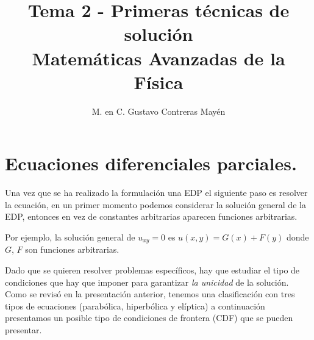 
\usepackage{apacite}
\title{Tema 2 - Primeras técnicas de solución \\[0.3em]  \large{Matemáticas Avanzadas de la Física}\vspace{-3ex}}
\author{M. en C. Gustavo Contreras Mayén}
\date{ }

\vspace{-4cm}
\maketitle
\fontsize{14}{14}\selectfont
\tableofcontents
\newpage
\section{Ecuaciones diferenciales parciales.}
Una vez que se ha realizado la formulación una EDP el siguiente paso es resolver la ecuación, en un primer momento podemos considerar la solución general de la EDP, entonces en vez de constantes arbitrarias aparecen funciones arbitrarias.
\par
Por ejemplo, la solución general de $u_{xy} = 0$ es $u(x, y) = G(x) + F (y)$ donde $G$, $F$ son funciones arbitrarias.
\par
Dado que se quieren resolver problemas específicos, hay que estudiar el tipo de condiciones que hay que imponer para garantizar \emph{la unicidad} de la solución. Como se revisó en la presentación anterior, tenemos una clasificación con tres tipos de ecuaciones (parabólica, hiperbólica y elíptica) a continuación presentamos un posible tipo de condiciones de frontera (CDF) que se pueden presentar.

